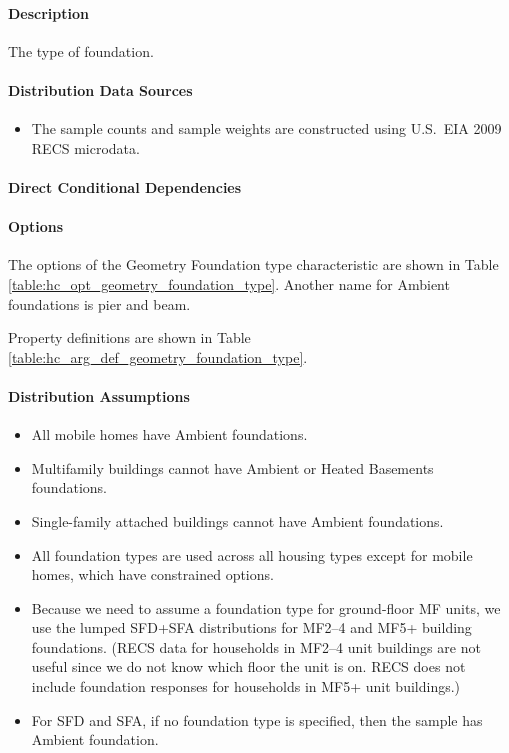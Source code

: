 \paragraph{Description}
% 
The type of foundation.

\paragraph{Distribution Data Sources}
% 
\begin{itemize}
    \item The sample counts and sample weights are constructed using U.S.~EIA 2009 RECS microdata.
\end{itemize}

\paragraph{Direct Conditional Dependencies}


\paragraph{Options}
The options of the Geometry Foundation type characteristic are shown in Table \ref{table:hc_opt_geometry_foundation_type}. Another name for Ambient foundations is pier and beam.



Property definitions are shown in Table \ref{table:hc_arg_def_geometry_foundation_type}.



\paragraph{Distribution Assumptions}
% 
\begin{itemize}
    \item All mobile homes have Ambient foundations.
    \item Multifamily buildings cannot have Ambient or Heated Basements foundations.
    \item Single-family attached buildings cannot have Ambient foundations.
    \item All foundation types are used across all housing types  except for mobile homes, which have constrained options.
    \item Because we need to assume a foundation type for ground-floor MF units, we use the lumped SFD+SFA distributions for MF2--4 and MF5+ building foundations. (RECS data for households in MF2--4 unit buildings are not useful since we do not know which floor the unit is on. RECS does not include foundation responses for households in MF5+ unit buildings.)
    \item For SFD and SFA, if no foundation type is specified, then the sample has Ambient foundation.
\end{itemize}
